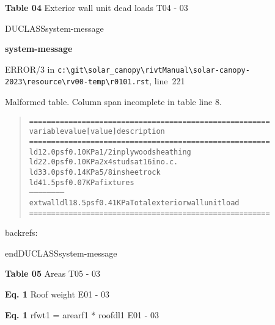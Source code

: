 \documentclass[12pt,notitle,letterpaper]{report}
\newenvironment{DUclass}[1]%
  {%
   \def\DocutilsClassFunctionName{DUCLASS#1}
     \csname \DocutilsClassFunctionName \endcsname}%
  {\csname end\DocutilsClassFunctionName \endcsname}%
\newenvironment{DUadmonition}%
  {\begin{center}
     \begin{lrbox}{\DUadmonitionbox}
       \begin{minipage}{0.9\linewidth}
  }%
  {    \end{minipage}
     \end{lrbox}
     \fbox{\usebox{\DUadmonitionbox}}
   \end{center}
  }
\newenvironment{DUlineblock}[1]{%
    \list{}{\setlength{\partopsep}{\parskip}
            \addtolength{\partopsep}{\baselineskip}
            \setlength{\topsep}{0pt}
            \setlength{\itemsep}{0.15\baselineskip}
            \setlength{\parsep}{0pt}
            \setlength{\leftmargin}{#1}}
    \raggedright
  }
  {\endlist}
\providecommand*{\DUtitle}[1]{%
  \smallskip\noindent\textbf{#1}\smallskip}
\begin{document}
\begin{DUlineblock}{0em}
\item[] 
\end{DUlineblock}

\textbf{Table 04} Exterior wall unit dead loads \hfill T04 - 03

\begin{DUclass}{system-message}
\begin{DUadmonition}
\DUtitle{system-message
}

{\color{red}ERROR/3} in \texttt{c:\textbackslash{}git\textbackslash{}solar\_canopy\textbackslash{}rivtManual\textbackslash{}solar-canopy-2023\textbackslash{}resource\textbackslash{}rv00-temp\textbackslash{}r0101.rst}, line~221

Malformed table.
Column span incomplete in table line 8.

\begin{quote}
\begin{alltt}
==========  =======  =========  =============================
variable      value    [value]  description
==========  =======  =========  =============================
ld1         2.0 psf   0.10 KPa  1/2 in plywood sheathing
ld2         2.0 psf   0.10 KPa  2x4 studs at 16 in o.c.
ld3         3.0 psf   0.14 KPa  5/8 in sheet rock
ld4         1.5 psf   0.07 KPa  fixtures
------       ------     ------  ------
extwalldl1  8.5 psf   0.41 KPa  Total exterior wall unit load
==========  =======  =========  =============================
\end{alltt}
\end{quote}
backrefs: \end{DUadmonition}
\end{DUclass}

\begin{DUlineblock}{0em}
\item[] 
\end{DUlineblock}

\textbf{Table 05} Areas \hfill T05 - 03

\begin{DUlineblock}{0em}
\item[] 
\end{DUlineblock}

\textbf{Eq. 1} Roof weight \hfill E01 - 03

\begin{DUlineblock}{0em}
\item[] 
\end{DUlineblock}

\textbf{Eq. 1} rfwt1 = arearf1 * roofdl1 \hfill E01 - 03
\end{document}
